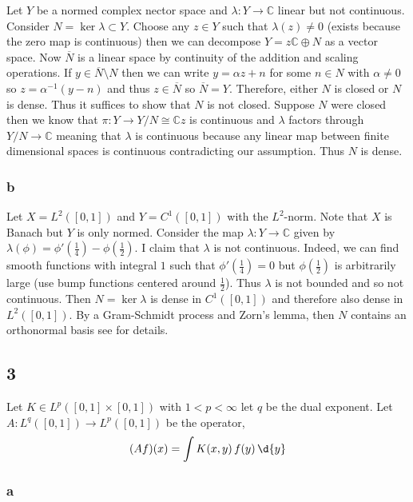 \documentclass[12pt]{article}
\renewcommand{\C}{\mathbb{C}}
\begin{document}
Let $Y$ be a normed complex nector space and $\lambda : Y \to \C$ linear but not continuous. Consider $N = \ker{\lambda} \subset Y$. Choose any $z \in Y$ such that $\lambda(z) \neq 0$ (exists because the zero map is continuous) then we can decompose $Y = z \C \oplus N$ as a vector space. Now $\overline{N}$ is a linear space by continuity of the addition and scaling operations. If $y \in \overline{N} \setminus N$ then we can write $y = \alpha z + n$ for some $n \in N$ with $\alpha \neq 0$ so $z = \alpha^{-1}(y - n)$ and thus $z \in \overline{N}$ so $\overline{N} = Y$. Therefore, either $N$ is closed or $N$ is dense. Thus it suffices to show that $N$ is not closed. Suppose $N$ were closed then we know that $\pi : Y \to Y / N \cong \C z$ is continuous and $\lambda$ factors through $Y/N \to \C$ meaning that $\lambda$ is continuous because any linear map between finite dimensional spaces is continuous contradicting our assumption. Thus $N$ is dense.

\subsubsection{b}

Let $X = L^2([0,1])$ and $Y = C^1([0,1])$ with the $L^2$-norm. Note that $X$ is Banach but $Y$ is only normed. Consider the map $\lambda : Y \to \C$ given by $\lambda(\phi) = \phi'(\tfrac{1}{4}) - \phi(\tfrac{1}{2})$. I claim that $\lambda$ is not continuous. Indeed, we can find smooth functions with integral $1$ such that $\phi'(\tfrac{1}{4}) = 0$ but $\phi(\tfrac{1}{2})$ is arbitrarily large (use bump functions centered around $\tfrac{1}{2}$). Thus $\lambda$ is not bounded and so not continuous. Then $N = \ker{\lambda}$ is dense in $C^1([0,1])$ and therefore also dense in $L^2([0,1])$. By a Gram-Schmidt process and Zorn's lemma, then $N$ contains an orthonormal basis see  for details.

\subsection{3}

Let $K \in L^p([0,1] \times [0,1])$ with $1 < p < \infty$ let $q$ be the dual exponent. Let $A : L^q([0,1]) \to L^p([0,1])$ be the operator,
\[ (A f)(x) = \int K(x, y) \, f(y) \, \d{y} \]

\subsubsection{a}
\end{document}
